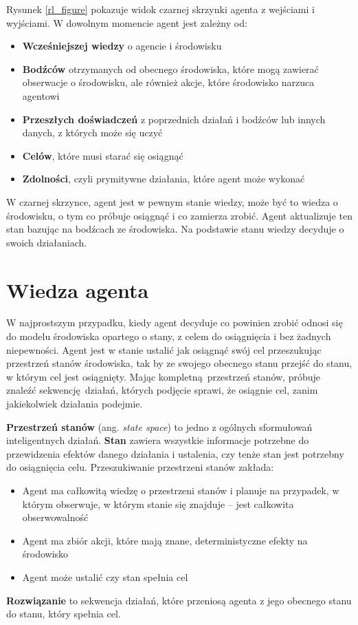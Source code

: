 \documentclass[a4paper, 12pt,oneside]{book}
\begin{document}
Rysunek \ref{rl_figure} pokazuje widok czarnej skrzynki agenta z wejściami
i wyjściami. W dowolnym momencie agent jest zależny od:
\begin{itemize}
	\setlength\itemsep{-0.4em}
	\item \textbf{Wcześniejszej wiedzy} o agencie i środowisku
	\item \textbf{Bodźców} otrzymanych od obecnego
		środowiska, które mogą zawierać obserwacje o
		środowisku, ale również akcje, które środowisko
		narzuca agentowi
	\item \textbf{Przeszłych doświadczeń} z poprzednich
		działań i bodźców lub innych danych, z których
		może się uczyć
	\item \textbf{Celów}, które musi starać się osiągnąć
	\item \textbf{Zdolności}, czyli prymitywne działania, które agent
		może wykonać
\end{itemize}
W czarnej skrzynce, agent jest w pewnym stanie wiedzy, może być to wiedza o
środowisku, o tym co próbuje osiągnąć i co zamierza zrobić. Agent aktualizuje
ten stan bazując na bodźcach ze środowiska. Na podstawie stanu wiedzy decyduje
o swoich działaniach\cite{ai_foundations_agents_situated}.

\section{Wiedza agenta} 
W najprostszym przypadku, kiedy agent decyduje co powinien zrobić odnosi się
do modelu środowiska opartego o stany, z celem do osiągnięcia i bez żadnych
niepewności. Agent jest w stanie ustalić jak osiągnąć swój cel przeszukując
przestrzeń stanów środowiska, tak by ze swojego obecnego stanu przejść do
stanu, w którym cel jest osiągnięty. Mając kompletną przestrzeń stanów, próbuje
znaleźć sekwencję działań, których podjęcie sprawi, że osiągnie cel, zanim
jakiekolwiek działania podejmie.

\textbf{Przestrzeń stanów} (ang. \textit{state space}) to jedno z ogólnych
sformułowań inteligentnych działań. \textbf{Stan} zawiera wszystkie informacje
potrzebne do przewidzenia efektów danego działania i ustalenia, czy tenże stan
jest potrzebny do osiągnięcia celu. Przeszukiwanie przestrzeni stanów zakłada:
\begin{itemize}
	\setlength\itemsep{-0.4em}
\item Agent ma całkowitą wiedzę o przestrzeni stanów i planuje na przypadek,
	w którym obserwuje, w którym stanie się znajduje -- jest całkowita
	obserwowalność
\item Agent ma zbiór akcji, które mają znane, deterministyczne efekty na
	środowisko
\item Agent może ustalić czy stan spełnia cel
\end{itemize}
\textbf{Rozwiązanie} to sekwencja działań, które przeniosą agenta z jego
obecnego stanu do stanu, który spełnia cel.
\end{document}
